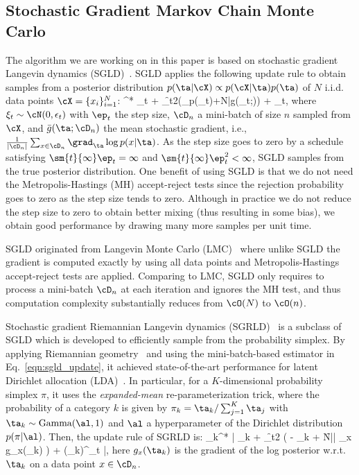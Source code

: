 \subsection{Stochastic Gradient Markov Chain Monte Carlo}
The algorithm we are working on in this paper is based on stochastic gradient Langevin dynamics (SGLD)~\cite{welling2011bayesian}. SGLD applies the following update rule to obtain samples from a posterior distribution $p(\ta|\cX) \propto p(\cX|\ta) p(\ta)$ of $N$ i.i.d. data points $\cX=\{x_i\}_{i=1}^{N}$:
\bea
\ta^* \law \ta_t + \f{\epsilon_t}{2}\left(\nabla_{\ta}\log p(\ta_t)+N\bar{g}(\ta_t;\SGLDMinibatch)\right) + \xi_t, \label{eqn:sgld_update}
\eea
where $\xi_t \sim \cN(0,\epsilon_t )$ with $\ep_t$ the step size, $\SGLDMinibatch$ a mini-batch of size $n$ sampled from $\cX$, and $\bar{g}(\ta;\SGLDMinibatch)$ the mean stochastic gradient, i.e., $\frac{1}{|\SGLDMinibatch|}\sum_{x\in \SGLDMinibatch}^{}\grad_{\ta} \log p(x|\ta)$. As the step size goes to zero by a schedule satisfying $\sm{t}{\infty}\ep_t = \infty$ and $\sm{t}{\infty}\ep_t^2 < \infty$, SGLD samples from the true posterior distribution. One benefit of using SGLD is that we do not need the Metropolis-Hastings (MH) accept-reject tests since the rejection probability goes to zero as the step size tends to zero. Although in practice we do not reduce the step size to zero to obtain better mixing (thus resulting in some bias), we obtain good performance by drawing many more samples per unit time. 

SGLD originated from Langevin Monte Carlo (LMC)~\cite{girolami2011riemann} where
unlike SGLD the gradient is computed exactly by using all data points and Metropolis-Hastings accept-reject tests are applied. Comparing to LMC, SGLD only requires to process a mini-batch $\SGLDMinibatch$ at each iteration and ignores the MH test, and thus computation complexity substantially reduces from $\cO(N)$ to $\cO(n)$.   

Stochastic gradient Riemannian Langevin dynamics (SGRLD)~\cite{patterson2013stochastic} is a subclass of SGLD which is developed to efficiently sample from the probability simplex. By applying Riemannian geometry~\cite{girolami2011riemann} and using the mini-batch-based estimator in Eq.~\ref{eqn:sgld_update}, it achieved state-of-the-art performance for latent Dirichlet allocation (LDA)~\cite{blei2003latent}. In particular, for a $K$-dimensional probability simplex $\pi$, it uses the \textit{expanded-mean} re-parameterization trick, where the probability of a category $k$ is given by $\pi_k = \ta_k / \sum_{j=1}^K \ta_j$ with $\ta_k \sim \text{Gamma}(\al,1)$ and $\al$ a hyperparameter of the Dirichlet distribution $p(\pi | \al )$. Then, the update rule of SGRLD is:
\bea
\ta_{k}^* \law \left| \ta_{k} + \f{\ep_t}{2} \left( \al - \ta_{k} + \f{N}{|\SGLDMinibatch|} \sum_{x \in \SGLDMinibatch} g_x(\ta_{k}) \right) + (\ta_{k})^\ha \xi_{t} \right|, \label{eqn:sgrld_update}
\eea
here $g_x(\ta_{k})$ is the gradient of the log posterior w.r.t. $\ta_{k}$ on a data point $x\in \SGLDMinibatch$.

